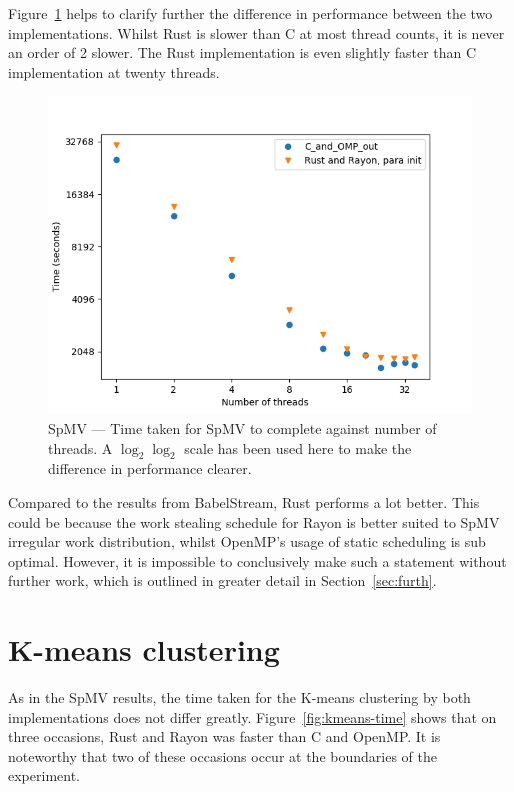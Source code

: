 Figure~\ref{fig:sparse-time} helps to clarify further the difference in performance between  the two implementations.  Whilst Rust is slower than C at most thread counts, it is never an order of 2 slower.
The Rust implementation is even slightly faster than C implementation at twenty threads. 
\begin{figure}[h]
\centering
\includegraphics[width=.9\linewidth]{figs/sparse/time.png}
\caption[SpMV --- Time]{SpMV --- Time taken for SpMV to complete against number of threads. A $\log_2 \log_2$ scale has been used here to make the difference in performance clearer.}\label{fig:sparse-time}
\end{figure}

Compared to the results from BabelStream, Rust performs a lot better. This could be because the work stealing schedule for Rayon is better suited to SpMV irregular work distribution, whilst OpenMP's usage of static scheduling is sub optimal. However, it is impossible to conclusively make such a statement without further work, which is outlined in greater detail in Section~\ref{sec:furth}.


\section{K-means clustering}\label{sec:res-kmeans}

As in the SpMV results, the time taken for the K-means clustering by both implementations does not differ greatly. Figure~\ref{fig:kmeans-time} shows that on three occasions, Rust and Rayon was faster than C and OpenMP\@. It is noteworthy that two of these occasions occur at the boundaries of the experiment.

